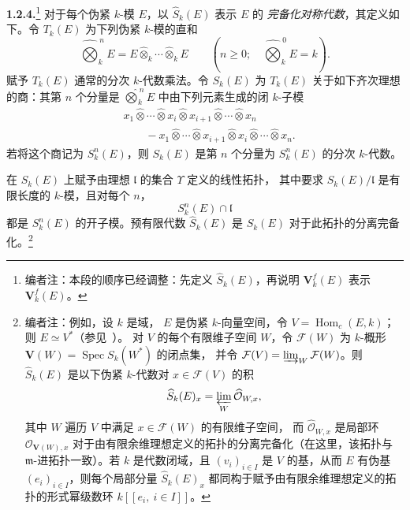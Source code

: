 
\medskip
\noindent{}\textbf{1.2.4.}\footnote{编者注：本段的顺序已经调整：先定义 \(\widehat S_k(E)\)，再说明
\(\mathbf V^f_k(E)\) 表示 \(\mathbf V^f_k(E)\)。}
\label{sga3:VIIB:1.2.4}
对于每个伪紧 \(k\)-模 \(E\)，以 \(\widehat S_k(E)\) 表示 \(E\) 的
\emph{完备化对称代数}，其定义如下。令 \(T_k(E)\) 为下列伪紧 \(k\)-模的直和
\[
  \widehat{\bigotimes}_{k}^{\,n}E
  =
  E\widehat{\otimes}_{k}\cdots\widehat{\otimes}_{k}E
  \qquad
  \left(
    n\geq0;\quad
    \widehat{\bigotimes}_{k}^{\,0}E=k
  \right).
\]
赋予 \(T_k(E)\) 通常的分次 \(k\)-代数乘法。令 \(S_k(E)\) 为
\(T_k(E)\) 关于如下齐次理想的商：其第 \(n\) 个分量是
\(\widehat{\bigotimes}_{k}^{\,n}E\) 中由下列元素生成的闭 \(k\)-子模
\[
\begin{aligned}
&x_1\widehat{\otimes}\cdots\widehat{\otimes}x_i
 \widehat{\otimes}x_{i+1}\widehat{\otimes}\cdots
 \widehat{\otimes}x_n
\\[-0.1em]
&\qquad{}-
x_1\widehat{\otimes}\cdots\widehat{\otimes}x_{i+1}
 \widehat{\otimes}x_i\widehat{\otimes}\cdots
 \widehat{\otimes}x_n.
\end{aligned}
\]
若将这个商记为 \(S_k^n(E)\)，则 \(S_k(E)\) 是第 \(n\) 个分量为
\(S_k^n(E)\) 的分次 \(k\)-代数。

在 \(S_k(E)\) 上赋予由理想 \(\mathfrak l\) 的集合 \(\Upsilon\) 定义的线性拓扑，
其中要求 \(S_k(E)/\mathfrak l\) 是有限长度的 \(k\)-模，且对每个 \(n\)，
\[
  S_k^n(E)\cap\mathfrak l
\]
都是 \(S_k^n(E)\) 的开子模。预有限代数 \(\widehat S_k(E)\) 是
\(S_k(E)\) 对于此拓扑的分离完备化。\footnote{编者注：例如，设 \(k\) 是域，
\(E\) 是伪紧 \(k\)-向量空间，令 \(V=\operatorname{Hom}_c(E,k)\)；则
\(E\simeq V^*\)\textup{（参见\ ）}。
对 \(V\) 的每个有限维子空间 \(W\)，令 \(\mathcal F(W)\) 为
\(k\)-概形 \(\mathbf V(W)=\operatorname{Spec}S_k(W^*)\) 的闭点集，
并令 \(\mathcal F(V)=\varinjlim_W\mathcal F(W)\)。则 \(\widehat S_k(E)\)
是以下伪紧 \(k\)-代数对 \(x\in\mathcal F(V)\) 的积
\[
  \widehat S_k(E)_x
  =
  \varprojlim_W\widehat{\mathcal O}_{W,x},
\]
其中 \(W\) 遍历 \(V\) 中满足 \(x\in\mathcal F(W)\) 的有限维子空间，
而 \(\widehat{\mathcal O}_{W,x}\) 是局部环 \(\mathcal O_{\mathbf V(W),x}\)
对于由有限余维理想定义的拓扑的分离完备化\textup{（在这里，该拓扑与
\(\mathfrak m\)-进拓扑一致）}。若 \(k\) 是代数闭域，且 \((v_i)_{i\in I}\) 是
\(V\) 的基，从而 \(E\) 有伪基 \((e_i)_{i\in I}\)，则每个局部分量
\(\widehat S_k(E)_x\) 都同构于赋予由有限余维理想定义的拓扑的形式幂级数环
\(k[[e_i,\ i\in I]]\)。}

